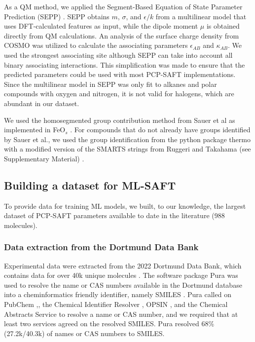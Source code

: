 As a QM method, we applied the Segment-Based Equation of State Parameter Prediction (SEPP) \cite{Kaminski2020}. SEPP obtains $m$, $\sigma$, and $\epsilon/k$ from a multilinear model that uses DFT-calculated features as input, while the dipole moment $\mu$ is obtained directly from QM calculations. An analysis of the surface charge density from COSMO\cite{Klamt1995} was utilized to calculate the associating parameters $\epsilon_{AB}$ and $\kappa_{AB}$. We used the strongest associating site although SEPP can take into account all binary associating interactions. This simplification was made to ensure that the predicted parameters could be used with most PCP-SAFT implementations. Since the multilinear model in SEPP was only fit to alkanes and polar compounds with oxygen and nitrogen, it is not valid for halogens, which are abundant in our dataset.

We used the homosegmented group contribution method from Sauer et al \cite{Sauer2014} as implemented in FeO$_{s}$ \cite{Rehner2023}. For compounds that do not already have groups identified by Sauer et al., we used the group identification from the python package thermo\cite{thermopython} with a modified version of the SMARTS strings from Ruggeri and Takahama (see Supplementary Material) \cite{Ruggeri2016}.

\subsection{Building a dataset for ML-SAFT}\label{subsec:data_set}

To provide data for training ML models, we built, to our knowledge, the largest dataset of PCP-SAFT parameters available to date in the literature (988 molecules).

\subsubsection{Data extraction from the Dortmund Data Bank}

Experimental data were extracted from the 2022 Dortmund Data Bank, which contains data for over 40k unique molecules \cite{dortmunddatabank}. The software package Pura was used to resolve the name or CAS numbers available in the Dortmund database into a cheminformatics friendly identifier, namely SMILES \cite{purapython}. Pura called on PubChem \cite{Kim2020},, the Chemical Identifier Resolver \cite{cir}, OPSIN \cite{Lowe2011}, and the Chemical Abstracts Service\cite{commonchem} to resolve a name or CAS number, and we required that at least two services agreed on the resolved SMILES. Pura resolved 68\% (27.2k/40.3k) of names or CAS numbers to SMILES. 

